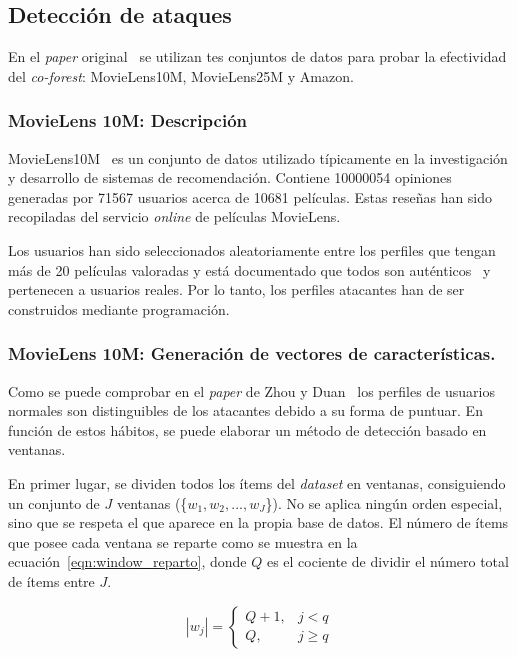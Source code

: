 \subsection{Detección de ataques}

En el \textit{paper} original~\cite{zhou2021SemisupervisedRecommendationAttack} se utilizan tes conjuntos de datos para probar la efectividad del \textit{co-forest}: MovieLens10M, MovieLens25M y Amazon.

\subsubsection{MovieLens 10M: Descripción}
 
MovieLens10M~\cite{groupLensDatasets} es un conjunto de datos utilizado típicamente en la investigación y desarrollo de sistemas de recomendación. Contiene 10000054 opiniones generadas por 71567 usuarios acerca de 10681 películas. Estas reseñas han sido recopiladas del servicio \textit{online} de películas MovieLens.

Los usuarios han sido seleccionados aleatoriamente entre los perfiles que tengan más de 20 películas valoradas y está documentado que todos son auténticos~\cite{zhou2021SemisupervisedRecommendationAttack} y pertenecen a usuarios reales. Por lo tanto, los perfiles atacantes han de ser construidos mediante programación.

\subsubsection{MovieLens 10M: Generación de vectores de características.}

Como se puede comprobar en el \textit{paper} de Zhou y Duan~\cite{zhou2021SemisupervisedRecommendationAttack} los perfiles de usuarios normales son distinguibles de los atacantes debido a su forma de puntuar. En función de estos hábitos, se puede elaborar un método de detección basado en ventanas.

En primer lugar, se dividen todos los ítems del \textit{dataset} en ventanas, consiguiendo un conjunto de $J$ ventanas (\{$w_1, w_2, ..., w_J$\}). No se aplica ningún orden especial, sino que se respeta el que aparece en la propia base de datos. El número de ítems que posee cada ventana se reparte como se muestra en la ecuación~\ref{eqn:window_reparto}, donde $Q$ es el cociente de dividir el número total de ítems entre $J$.
	
\[|w_j| = \left\{ \begin{array}{lr} Q + 1, & j < q\\ Q, & j \ge q \label{eqn:window_reparto} \end{array} \right. \] 

